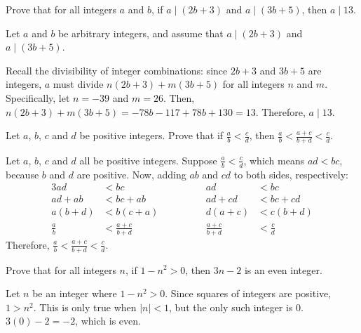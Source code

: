 \begin{recommended}
  Prove that for all integers $a$ and $b$, if $a \mid (2b + 3)$ and $a \mid (3b + 5)$, then $a \mid 13$.
\end{recommended}
\begin{prf}
  Let $a$ and $b$ be arbitrary integers, and assume that $a \mid (2b+3)$ and $a \mid (3b+5)$.

  Recall the divisibility of integer combinations: since $2b+3$ and $3b+5$ are integers,
  $a$ must divide $n(2b+3) + m(3b+5)$ for all integers $n$ and $m$.
  Specifically, let $n = -39$ and $m = 26$.
  Then, $n(2b+3) + m(3b+5) = -78b - 117 + 78b + 130 = 13$.
  Therefore, $a \mid 13$.
\end{prf}


\begin{recommended}
  Let $a$, $b$, $c$ and $d$ be positive integers.
  Prove that if $\frac a b < \frac c d$, then $\frac a b < \frac{a+c}{b+d} < \frac c d$.
\end{recommended}
\begin{prf}
  Let $a$, $b$, $c$ and $d$ all be positive integers.
  Suppose $\frac a b < \frac c d$, which means $ad < bc$, because $b$ and $d$ are positive.
  Now, adding $ab$ and $cd$ to both sides, respectively:
  \begin{alignat*}{3}
    ad        & < bc              & \hspace{4em} ad              & < bc        \\
    ad + ab   & < bc + ab         & \hspace{4em} ad + cd         & < bc + cd   \\
    a(b+d)    & < b(c+a)          & \hspace{4em} d(a+c)          & < c(b+d)    \\
    \frac a b & < \frac{a+c}{b+d} & \hspace{4em} \frac{a+c}{b+d} & < \frac c d
  \end{alignat*}
  Therefore, $\frac a b < \frac{a+c}{b+d} < \frac c d$.
\end{prf}


\begin{recommended}
  Prove that for all integers $n$, if $1-n^2 > 0$, then $3n - 2$ is an even integer.
\end{recommended}
\begin{prf}
  Let $n$ be an integer where $1-n^2 > 0$.
  Since squares of integers are positive, $1 > n^2$.
  This is only true when $|n| < 1$, but the only such integer is 0.
  $3(0)-2=-2$, which is even.
\end{prf}


